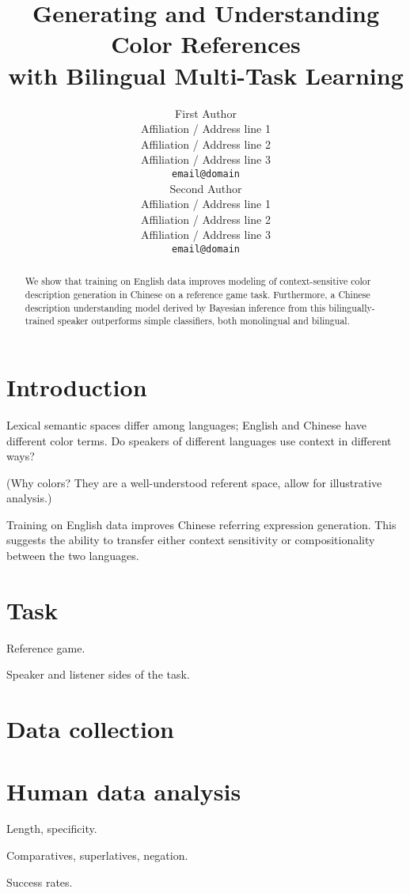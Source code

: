 \documentclass[11pt,a4paper]{article}
\title{Generating and Understanding Color References \\
  with Bilingual Multi-Task Learning}
\author{First Author \\
  Affiliation / Address line 1 \\
  Affiliation / Address line 2 \\
  Affiliation / Address line 3 \\
  {\tt email@domain} \\\And
  Second Author \\
  Affiliation / Address line 1 \\
  Affiliation / Address line 2 \\
  Affiliation / Address line 3 \\
  {\tt email@domain} \\}
\date{}
\begin{document}
\maketitle
\begin{abstract}
  We show that training on English data improves modeling of context-sensitive color description generation in Chinese on a reference game task. Furthermore, a Chinese description understanding model derived by Bayesian inference from this bilingually-trained speaker outperforms simple classifiers, both monolingual and bilingual.
\end{abstract}

\section{Introduction}

Lexical semantic spaces differ among languages; English and Chinese have different color terms.
Do speakers of different languages use context in different ways?

(Why colors? They are a well-understood referent space, allow for illustrative analysis.)

Training on English data improves Chinese referring expression generation. This suggests the ability to transfer either context sensitivity or compositionality between the two languages.

\section{Task}

Reference game.

Speaker and listener sides of the task.

\section{Data collection}

\citet{Hawkins15_RealTimeWebExperiments}

\section{Human data analysis}

Length, specificity.

Comparatives, superlatives, negation.

Success rates.
\end{document}
